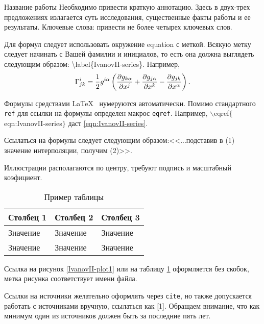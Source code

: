 \documentclass[oneside, a5paper,10pt]{article}
\begin{document}

\makeInf
{Название работы}
{Необходимо привести краткую аннотацию. Здесь в двух-трех
предложениях излагается суть исследования, существенные
факты работы и ее результаты.}
{Ключевые слова: привести не более четырех ключевых слов.}
{Для формул следует использовать окружение equation с меткой. Всякую метку следует начинать с Вашей фамилии и инициалов, то есть она должна выглядеть следующим образом: \textbackslash label\{IvanovII-series\}. Например, 
\begin{equation}
\label{eqn:IvanovII-series} %
\Gamma_{jk}^i = \frac{1}{2}g^{i\alpha}
\left(
\frac{\p g_{k\alpha}}{\p x^j}+
\frac{\p g_{j\alpha}}{\p x^k}-
\frac{\p g_{jk}}{\p x^\alpha}
\right).
\end{equation}

Формулы средствами \LaTeX~ нумеруются автоматически. Помимо стандартного \texttt{ref} для ссылки на формулы определен макрос \texttt{eqref}. Например, $\backslash$eqref$\{$eqn:IvanovII-series$\}$ даст \eqref{eqn:IvanovII-series}.

Ссылаться на формулы следует следующим образом:<<...подставив в (1) значение интерполяции, получим (2)>>.

Иллюстрации располагаются по центру, требуют подпись и масштабный коэфициент.

\begin{table}[h!]
	\caption{Пример таблицы}
	\centering
	\begin{tabular}{ | l | l | l | }
		\hline
		Столбец 1 & Столбец 2 & Столбец 3 \\
		\hline
		Значение & Значение & Значение\\
		\hline
		Значение & Значение & Значение \\
		\hline
	\end{tabular}
	\label{table:IvanovII-table1}
\end{table}

Ссылка на рисунок \ref{IvanovII-plot1} или на таблицу \ref{table:IvanovII-table1} оформляется без скобок, метка рисунка соответствует имени файла.

Ссылки на источники желательно оформлять через \texttt{cite}, но также допускается работать с источниками вручную, ссылаться как [1]. Обращаем внимание, что как минимум один из источников должен быть за последние пять лет.

}
\end{document}

